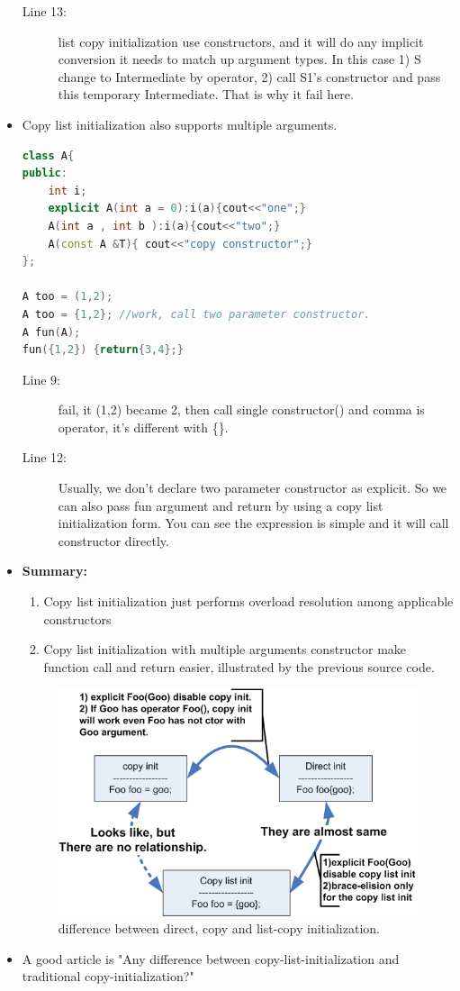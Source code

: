 \documentclass[a4paper,11pt,twoside]{book}
\begin{document}
\begin{itemize}
\begin{description}
		\item[Line 13:] list copy initialization use constructors, and it will do any implicit conversion it needs to match up argument types. In this case 1) S change to Intermediate by operator, 2) call S1's constructor and pass this temporary Intermediate. That is why it fail here.		
	\end{description}
	
	\item Copy list initialization also supports multiple arguments.
\begin{lstlisting}[frame=single, language=c++]
class A{
public:
	int i;
	explicit A(int a = 0):i(a){cout<<"one";}
	A(int a , int b ):i(a){cout<<"two";}
	A(const A &T){ cout<<"copy constructor";} 
};
		
A too = (1,2); 
A too = {1,2}; //work, call two parameter constructor. 
A fun(A);
fun({1,2}) {return{3,4};}
\end{lstlisting}
	\begin{description}
		\item[Line 9:] fail, it (1,2) became 2, then call single constructor() and comma is operator, it's different with \{\}.
		
		\item[Line 12:] Usually, we don't declare two parameter constructor as explicit. So we can also pass fun argument and return by using a copy list initialization form. You can see the expression is simple and it will call constructor directly. 
	\end{description}
	
	
	\item \textbf{Summary:}
	\begin{enumerate}
		\item Copy list initialization just performs overload resolution among applicable constructors
		
		\item Copy list initialization with multiple arguments constructor make function call and return easier, illustrated by the previous source code.
	\end{enumerate}
	
\begin{figure}[h]
    \centering
    \includegraphics[width=0.45\linewidth]{pics/copy_list.png}
    \caption{difference between direct, copy and list-copy initialization.}
    \label{fig:copylist}
\end{figure}
	\item A good article is "Any difference between copy-list-initialization and traditional copy-initialization?"
	
	
\end{itemize}
\end{document}
